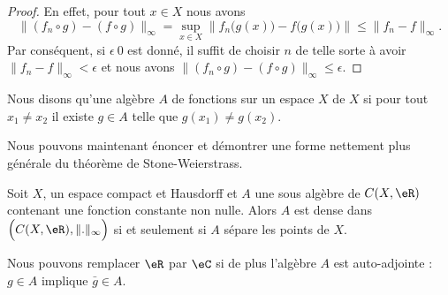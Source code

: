 \begin{proof}
    En effet, pour tout \( x\in X\) nous avons
    \begin{equation}
        \| (f_n\circ g)-(f\circ g) \|_{\infty}=\sup_{x\in X} \| f_n\big( g(x) \big)-f\big( g(x) \big) \|\leq \| f_n-f \|_{\infty}.
    \end{equation}
    Par conséquent, si \( \epsilon\>0\) est donné, il suffit de choisir \( n\) de telle sorte à avoir \( \| f_n-f \|_{\infty}<\epsilon\) et nous avons \( \| (f_n\circ g)-(f\circ g) \|_{\infty}\leq \epsilon\).
\end{proof}

\begin{definition}
    Nous disons qu'une algèbre \( A\) de fonctions sur un espace \( X\)  de \( X\) si pour tout \( x_1\neq x_2\) il existe \( g\in A\) telle que \( g(x_1)\neq g(x_2)\).
\end{definition}

Nous pouvons maintenant énoncer et démontrer une forme nettement plus générale du théorème de Stone-Weierstrass.
\begin{theorem} \label{ThoWmAzSMF}
    Soit \( X\), un espace compact et Hausdorff et \( A\) une sous algèbre de \( C(X,\eR)\) contenant une fonction constante non nulle. Alors \( A\) est dense dans \( \Big( C(X,\eR),\| . \|_{\infty}\Big)\) si et seulement si \( A\) sépare les points de \(X\).

    Nous pouvons remplacer \( \eR\) par \( \eC\) si de plus l'algèbre \( A\) est auto-adjointe : \( g\in A\) implique \( \bar g\in A\).
\end{theorem}

